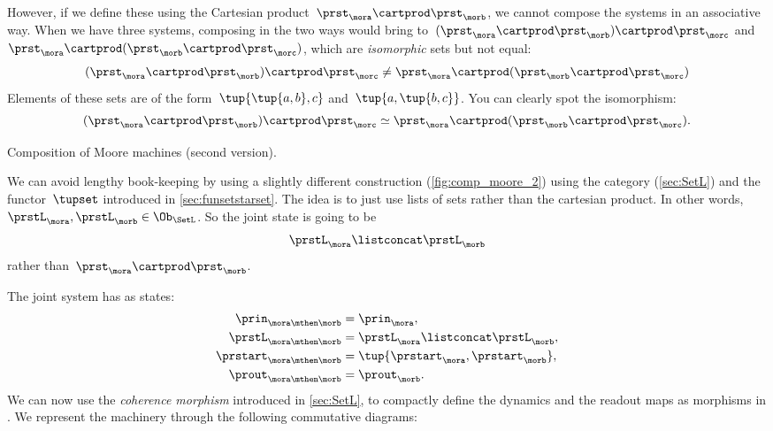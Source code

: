 {    However, if we define these using the Cartesian product~$\prst_{\mora} \cartprod \prst_{\morb}$, we cannot compose the systems in an associative way.
    When we have three systems, composing in the two ways would bring to~$(\prst_{\mora} \cartprod \prst_{\morb}) \cartprod \prst_{\morc}$ and~$\prst_{\mora} \cartprod (\prst_{\morb} \cartprod \prst_{\morc})$, which are \emph{isomorphic} sets but not equal:
    \begin{equation}
        \label{eq:assoc-fails1}
        (\prst_{\mora} \cartprod \prst_{\morb}) \cartprod \prst_{\morc} \neq \prst_{\mora} \cartprod (\prst_{\morb} \cartprod \prst_{\morc})
    \end{equation}
    Elements of these sets are of the form~$\tup{\tup{a,b},c}$ and~$\tup{a, \tup{b,c}}$.
    You can clearly spot the isomorphism:
    \begin{equation}
        \label{eq:assoc-fails2}
        (\prst_{\mora} \cartprod \prst_{\morb}) \cartprod \prst_{\morc} \simeq \prst_{\mora} \cartprod (\prst_{\morb} \cartprod \prst_{\morc}).
    \end{equation}

    \begin{marginfigure}
        \centering
        \caption{Composition of Moore machines (second version).}
        \label{fig:comp_moore_2}
    \end{marginfigure}

    We can avoid lengthy book-keeping by using a slightly different construction (\cref{fig:comp_moore_2}) using the \SetL category (\cref{sec:SetL}) and the functor~$\tupset$ introduced in \cref{sec:funsetstarset}.
    The idea is to just use lists of sets rather than the cartesian product.
    In other words,~$\prstL_\mora, \prstL_\morb\in \Ob_{\SetL}$.
    So the joint state is going to be~
    \begin{equation}
        \label{eq:moore-comp-good-joint}
        \prstL_{\mora} \listconcat   \prstL_{\morb}
    \end{equation}
    rather than~$\prst_{\mora} \cartprod \prst_{\morb}$.

    The joint system has as states:
    \begin{equation}
        \label{eq:moore-comp-good-1}
        \begin{aligned}
            \prin_{\mora\mthen\morb}    & = \prin_{\mora}, \\
            \prstL_{\mora\mthen\morb}   & = \prstL_{\mora}\listconcat  \prstL_{\morb}, \\
            \prstart_{\mora\mthen\morb} & = \tup{\prstart_{\mora},\prstart_{\morb}}, \\
            \prout_{\mora\mthen\morb}   & = \prout_{\morb}.
        \end{aligned}
    \end{equation}
    We can now use the \emph{coherence morphism} introduced in \cref{sec:SetL}, to compactly define the dynamics and the readout maps as morphisms in \Set.
    We represent the machinery through the following commutative diagrams:

}
